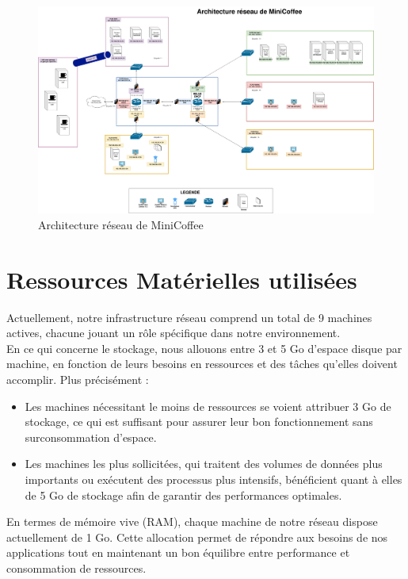\documentclass{article}
\begin{document}
\begin{figure}
    \centering
    \includegraphics[angle=-90, width=1\textwidth, trim=0 0 0 2.3cm, clip]{../assets/Architecture.drawio.png}
    \caption{Architecture réseau de MiniCoffee}
\end{figure}

\clearpage

\section{Ressources Matérielles utilisées}
Actuellement, notre infrastructure réseau comprend un total de 9 machines actives, chacune jouant un rôle spécifique dans notre environnement.
\\

En ce qui concerne le stockage, nous allouons entre 3 et 5 Go d’espace disque par machine, en fonction de leurs besoins en ressources et des tâches qu’elles doivent accomplir. Plus précisément :
\begin{itemize}
    \item Les machines nécessitant le moins de ressources se voient attribuer 3 Go de stockage, ce qui est suffisant pour assurer leur bon fonctionnement sans surconsommation d’espace.
    \item Les machines les plus sollicitées, qui traitent des volumes de données plus importants ou exécutent des processus plus intensifs, bénéficient quant à elles de 5 Go de stockage afin de garantir des performances optimales.
\end{itemize}

En termes de mémoire vive (RAM), chaque machine de notre réseau dispose actuellement de 1 Go. Cette allocation permet de répondre aux besoins de nos applications tout en maintenant un bon équilibre entre performance et consommation de ressources.
\\
\end{document}
